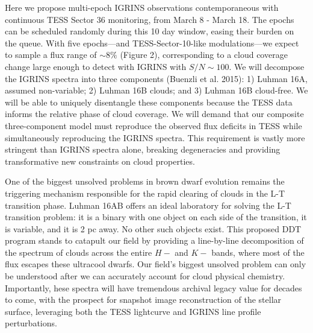 \documentclass[11pt]{article}
\begin{document}
{Here we propose multi-epoch IGRINS observations contemporaneous with continuous TESS Sector 36 monitoring, from March 8 - March 18.  The epochs can be scheduled randomly during this 10 day window, easing their burden on the queue.  With five epochs---and TESS-Sector-10-like modulations---we expect to sample a flux range of $\sim 8\%$ (Figure 2), corresponding to a cloud coverage change large enough to detect with IGRINS with $S/N\sim100$.  We will decompose the IGRINS spectra into three components (Buenzli et al. 2015): 1) Luhman 16A, assumed non-variable; 2) Luhman 16B clouds; and 3) Luhman 16B cloud-free.  We will be able to uniquely disentangle these components because the TESS data informs the relative phase of cloud coverage.  We will demand that our composite three-component model must reproduce the observed flux deficits in TESS while simultaneously reproducing the IGRINS spectra.  This requirement is vastly more stringent than IGRINS spectra alone, breaking degeneracies and providing transformative new constraints on cloud properties. 

One of the biggest unsolved problems in brown dwarf evolution remains the triggering mechanism responsible for the rapid clearing of clouds in the L-T transition phase.  Luhman 16AB offers an ideal laboratory for solving the L-T transition problem: it is a binary with one object on each side of the transition, it is variable, and it is 2 pc away. No other such objects exist. This proposed DDT program stands to catapult our field by providing a line-by-line decomposition of the spectrum of clouds across the entire $H-$ and $K-$ bands, where most of the flux escapes these ultracool dwarfs.  Our field's biggest unsolved problem can only be understood after we can accurately account for cloud physical chemistry.  Importantly, hese spectra will have tremendous archival legacy value for decades to come, with the prospect for snapshot image reconstruction of the stellar surface, leveraging both the TESS lightcurve and IGRINS line profile perturbations.





\clearpage

}
\end{document}
